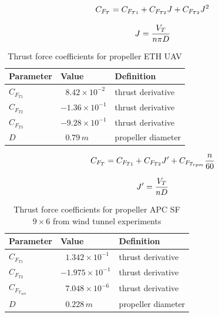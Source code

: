 \begin{equation}{\label{eqn:thrustETHcraft}}
C_{F_T} = C_{F_{T1}} + C_{F_{T2}} J + C_{F_{T3}} J^2 
\end{equation}

\begin{equation}{\label{eqn:advRatETHcraft}}
J = \frac{V_T}{n \pi D}
\end{equation}

\begin{table}
\label{arm:ETHcraft}
\caption{Thrust force coefficients for propeller ETH UAV \cite{ducard2009fault}}
\label{arm:thrustForce}
\begin{center}
\begin{tabular}{ ||p{3cm}|p{3cm}|p{4cm}||}\hline
\textbf{Parameter} & \textbf{Value} & \textbf{Definition} \\\hline
$C_{F_{T1}} $                 & $\ \ \, 8.42 \times 10^{-2}$	   & thrust derivative \\\hline
$C_{F_{T2}} $                 & $-1.36 \times 10^{-1}$	           & thrust derivative \\\hline
$C_{F_{T3}} $                 & $-9.28 \times 10^{-1}$                 & thrust derivative \\\hline
$D$                                 & $\ \ \, 0.79 \, m$                           & propeller diameter \\\hline
\end{tabular}
\end{center}
\end{table}

\cite{bronz2017flight}

\begin{equation}{\label{eqn:thrustCoefMAKO}}
C_{F_T} = C_{F_{T1}} + C_{F_{T2}} J^\prime + C_{F_{T_{rpm}}} \frac{n}{60} 
\end{equation}

\begin{equation}{\label{eqn:advRatMAKO}}
J^\prime = \frac{V_T}{n D}
\end{equation}

\begin{table}
\label{arm:MAKO}
\caption{Thrust force coefficients for propeller APC SF $9 \times 6$ from wind tunnel experiments \cite{bronz2017flight}}
\label{arm:thrustForce}
\begin{center}
\begin{tabular}{ ||p{3cm}|p{3cm}|p{4cm}||}\hline
\textbf{Parameter} & \textbf{Value} & \textbf{Definition} \\\hline
$C_{F_{T1}}$                   & $\ \ \, 1.342 \times 10^{-1}$	   & thrust derivative \\\hline
$C_{F_{T2}}$                 & $-1.975 \times 10^{-1}$	          & thrust derivative \\\hline
$C_{F_{T_{rpm}}}  $           & $\ \ \, 7.048 \times 10^{-6}$    & thrust derivative \\\hline
$D$                              & $\ \ \, 0.228 \, m$                          & propeller diameter \\\hline
\end{tabular}
\end{center}
\end{table}


